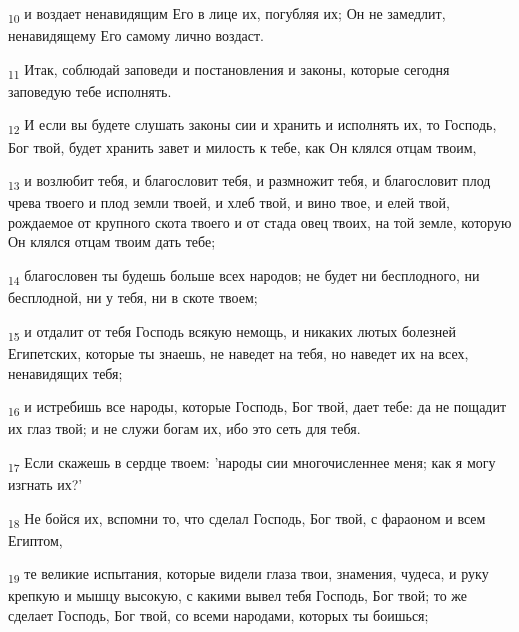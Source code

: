 \begin{tcolorbox}
\textsubscript{10} и воздает ненавидящим Его в лице их, погубляя их; Он не замедлит, ненавидящему Его самому лично воздаст.
\end{tcolorbox}
\begin{tcolorbox}
\textsubscript{11} Итак, соблюдай заповеди и постановления и законы, которые сегодня заповедую тебе исполнять.
\end{tcolorbox}
\begin{tcolorbox}
\textsubscript{12} И если вы будете слушать законы сии и хранить и исполнять их, то Господь, Бог твой, будет хранить завет и милость к тебе, как Он клялся отцам твоим,
\end{tcolorbox}
\begin{tcolorbox}
\textsubscript{13} и возлюбит тебя, и благословит тебя, и размножит тебя, и благословит плод чрева твоего и плод земли твоей, и хлеб твой, и вино твое, и елей твой, рождаемое от крупного скота твоего и от стада овец твоих, на той земле, которую Он клялся отцам твоим дать тебе;
\end{tcolorbox}
\begin{tcolorbox}
\textsubscript{14} благословен ты будешь больше всех народов; не будет ни бесплодного, ни бесплодной, ни у тебя, ни в скоте твоем;
\end{tcolorbox}
\begin{tcolorbox}
\textsubscript{15} и отдалит от тебя Господь всякую немощь, и никаких лютых болезней Египетских, которые ты знаешь, не наведет на тебя, но наведет их на всех, ненавидящих тебя;
\end{tcolorbox}
\begin{tcolorbox}
\textsubscript{16} и истребишь все народы, которые Господь, Бог твой, дает тебе: да не пощадит их глаз твой; и не служи богам их, ибо это сеть для тебя.
\end{tcolorbox}
\begin{tcolorbox}
\textsubscript{17} Если скажешь в сердце твоем: 'народы сии многочисленнее меня; как я могу изгнать их?'
\end{tcolorbox}
\begin{tcolorbox}
\textsubscript{18} Не бойся их, вспомни то, что сделал Господь, Бог твой, с фараоном и всем Египтом,
\end{tcolorbox}
\begin{tcolorbox}
\textsubscript{19} те великие испытания, которые видели глаза твои, знамения, чудеса, и руку крепкую и мышцу высокую, с какими вывел тебя Господь, Бог твой; то же сделает Господь, Бог твой, со всеми народами, которых ты боишься;
\end{tcolorbox}
